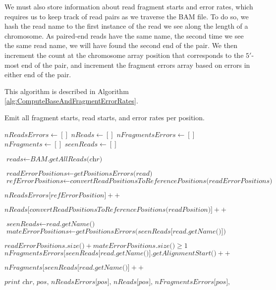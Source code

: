 We must also store information about read fragment starts and error rates, which requires us to keep track of read pairs as we traverse the BAM file.  To do so, we hash the read name to the first instance of the read we see along the length of a chromosome.  As paired-end reads have the same name, the second time we see the same read name, we will have found the second end of the pair.  We then increment the count at the chromosome array position that corresponds to the $5'$-most end of the pair, and increment the fragment errors array based on errors in either end of the pair.

This algorithm is described in Algorithm \ref{alg:ComputeBaseAndFragmentErrorRates}.

\begin{algorithm}
\caption{Emit all fragment starts, read starts, and error rates per position.}
\label{alg:ComputeBaseAndFragmentErrorRates}
\begin{algorithmic}[1]
        \State $\textit{nReadsErrors} \gets []$
        \State $\textit{nReads} \gets []$
        \State $\textit{nFragmentsErrors} \gets []$
        \State $\textit{nFragments} \gets []$
        \State $\textit{seenReads} \gets []$

        \State $\textit{reads} \gets \textit{BAM.getAllReads(chr)}$

            \State $\textit{readErrorPositions} \gets \textit{getPositionsErrors(read)}$
            \State $\textit{refErrorPositions} \gets \textit{convertReadPositionsToReferencePositions(readErrorPositions)}$

                \State $\textit{nReadsErrors[refErrorPosition]}++$
            \EndFor

                \State $\textit{nReads[convertReadPositionsToReferencePositions(readPosition)]}++$
            \EndFor

                \State $\textit{seenReads} \gets \textit{read.getName()}$
            \Else
                \State $\textit{mateErrorPositions} \gets \textit{getPositionsErrors(seenReads[read.getName()])}$

                \If $\textit{readErrorPositions.size()} + \textit{mateErrorPositions.size()} \ge 1$
                    \State $\textit{nFragmentsErrors[seenReads[read.getName()].getAlignmentStart()}++$  
                \EndIf

                \State $\textit{nFragments[seenReads[read.getName()]}++$  
            \EndIf
        \EndFor

            \State $\textit{print chr, pos, nReadsErrors[pos], nReads[pos], nFragmentsErrors[pos], nFragments[pos]}$
        \EndFor
    \EndFor
\EndFunction
\end{algorithmic}
\end{algorithm}

